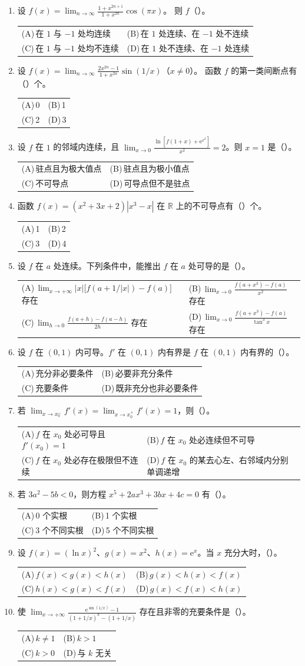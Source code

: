 \documentclass[UTF8,a4paper,zihao=-4,fontset=fandol]{ctexart}
\makeatletter
\newcommand{\choices}[4]{%
  \par\noindent\begin{tabularx}{\linewidth}{@{}X@{\hspace{1em}}X@{}}
    (A)\,#1 & (B)\,#2 \\
    (C)\,#3 & (D)\,#4
  \end{tabularx}\par}
\makeatother
\begin{document}
\begin{enumerate}
{对任意 $\varepsilon>0$，充分大的 $n$ 都满足 $0<|x_n|<\varepsilon$}
{$\{|x_n|\}$ 必有最大值}
\item 设 $\displaystyle f(x)=\lim_{n\to\infty}\frac{1+x^{2n+1}}{1+x^{2n}}\cos(\pi x)$。
则 $f$（\quad）。
\choices{在 $1$ 与 $-1$ 处均连续}{在 $1$ 处连续、在 $-1$ 处不连续}
{在 $1$ 与 $-1$ 处均不连续}{在 $1$ 处不连续、在 $-1$ 处连续}
\item 设 $\displaystyle f(x)=\lim_{n\to\infty}\frac{2x^{2n}-1}{1+x^{2n}}\sin(1/x)$（$x\ne0$）。
函数 $f$ 的第一类间断点有（\quad）个。
\choices{0}{1}{2}{3}
\item 设 $f$ 在 $1$ 的邻域内连续，且
$\displaystyle\lim_{x\to0}\frac{\ln[f(1+x)+\mathrm{e}^{x^2}]}{x^2}=2$。则 $x=1$ 是（\quad）。
\choices{驻点且为极大值点}{驻点且为极小值点}{不可导点}{可导点但不是驻点}
\item 函数 $f(x)=(x^2+3x+2)|x^3-x|$ 在 $\mathbb R$ 上的不可导点有（\quad）个。
\choices{1}{2}{3}{4}
\item 设 $f$ 在 $a$ 处连续。下列条件中，能推出 $f$ 在 $a$ 处可导的是（\quad）。
\choices{$\displaystyle\lim_{x\to+\infty}|x|\big[f(a+1/|x|)-f(a)\big]$ 存在}
{$\displaystyle\lim_{x\to0}\frac{f(a+x^3)-f(a)}{x^2}$ 存在}
{$\displaystyle\lim_{h\to0}\frac{f(a+h)-f(a-h)}{2h}$ 存在}
{$\displaystyle\lim_{x\to0}\frac{f(a+x^3)-f(a)}{\tan^3 x}$ 存在}
\item 设 $f$ 在 $(0,1)$ 内可导。$f'$ 在 $(0,1)$ 内有界是 $f$ 在 $(0,1)$ 内有界的（\quad）。
\choices{充分非必要条件}{必要非充分条件}{充要条件}{既非充分也非必要条件}
\item 若 $\displaystyle\lim_{x\to x_0^-}f'(x)=\lim_{x\to x_0^+}f'(x)=1$，则（\quad）。
\choices{$f$ 在 $x_0$ 处必可导且 $f'(x_0)=1$}{$f$ 在 $x_0$ 处必连续但不可导}
{$f$ 在 $x_0$ 处必存在极限但不连续}{$f$ 在 $x_0$ 的某去心左、右邻域内分别单调递增}
\item 若 $3a^2-5b<0$，则方程 $x^5+2ax^3+3bx+4c=0$ 有（\quad）。
\choices{0 个实根}{1 个实根}{3 个不同实根}{5 个不同实根}
\item 设 $f(x)=(\ln x)^2$、$g(x)=x^2$、$h(x)=\mathrm{e}^x$。当 $x$ 充分大时，（\quad）。
\choices{$f(x)<g(x)<h(x)$}{$g(x)<h(x)<f(x)$}
{$h(x)<g(x)<f(x)$}{$g(x)<f(x)<h(x)$}
\item 使 $\displaystyle\lim_{x\to+\infty}
\frac{\mathrm{e}^{\sin(1/x)}-1}{(1+1/x)^k-(1+1/x)}$ 存在且非零的充要条件是（\quad）。
\choices{$k\ne1$}{$k>1$}{$k>0$}{与 $k$ 无关}

\end{enumerate}
\end{document}
